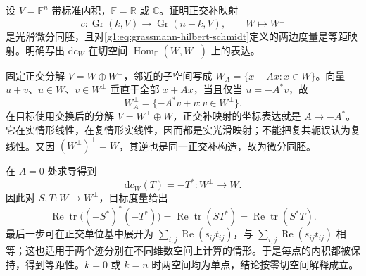 \begin{exercise}\label{g1:ex:grassmann-complement-isometry}
	设 \(V=\mathbb F^n\) 带标准内积，\(\mathbb F=\mathbb R\) 或 \(\mathbb C\)。证明正交补映射
	\[
		c:\operatorname{Gr}(k,V)\longrightarrow\operatorname{Gr}(n-k,V),
		\qquad W\longmapsto W^\perp
	\]
	是光滑微分同胚，且对\eqref{g1:eq:grassmann-hilbert-schmidt}定义的两边度量是等距映射。明确写出 \(\mathrm{d}c_W\) 在切空间 \(\operatorname{Hom}_{\mathbb F}(W,W^\perp)\) 上的表达。
\end{exercise}
\begin{solution}
	固定正交分解 \(V=W\oplus W^\perp\)，邻近的子空间写成 \(W_A=\{x+Ax:x\in W\}\)。向量 \(u+v\)、\(u\in W\)、\(v\in W^\perp\) 垂直于全部 \(x+Ax\)，当且仅当 \(u=-A^*v\)，故
	\[
		W_A^\perp=\{-A^*v+v:v\in W^\perp\}.
	\]
	在目标使用交换后的分解 \(V=W^\perp\oplus W\)，正交补映射的坐标表达就是 \(A\mapsto-A^*\)。它在实情形线性，在复情形实线性，因而都是实光滑映射；不能把复共轭误认为复线性。又因 \((W^\perp)^\perp=W\)，其逆也是同一正交补构造，故为微分同胚。

	在 \(A=0\) 处求导得到
	\[
		\mathrm{d}c_W(T)=-T^*:
		W^\perp\longrightarrow W.
	\]
	因此对 \(S,T:W\to W^\perp\)，目标度量给出
	\[
		\operatorname{Re}\operatorname{tr}\bigl((-S^*)^*(-T^*)\bigr)
		=\operatorname{Re}\operatorname{tr}(ST^*)
		=\operatorname{Re}\operatorname{tr}(S^*T).
	\]
	最后一步可在正交单位基中展开为 \(\sum_{i,j}\operatorname{Re}(s_{ij}\overline{t_{ij}})\)，与 \(\sum_{i,j}\operatorname{Re}(\overline{s_{ij}}t_{ij})\) 相等；这也适用于两个迹分别在不同维数空间上计算的情形。于是每点的内积都被保持，得到等距性。\(k=0\) 或 \(k=n\) 时两空间均为单点，结论按零切空间解释成立。
\end{solution}


